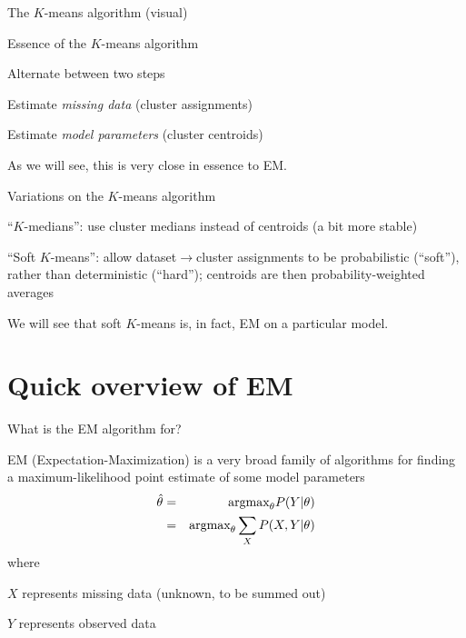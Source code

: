 \documentclass{beamer}
\begin{document}
\begin{frame}{The $K$-means algorithm (visual)}
\end{frame}


\begin{frame}{Essence of the $K$-means algorithm}


Alternate between two steps
 \itemb
 \item Estimate {\em missing data} (cluster assignments)
 \item Estimate {\em model parameters} (cluster centroids)
 \iteme

\vspace{\baselineskip}

As we will see, this is very close in essence to EM.

\end{frame}

\begin{frame}{Variations on the $K$-means algorithm}

\itemb
\item ``$K$-medians'': use cluster medians instead of centroids (a bit more stable)
\item \alert{``Soft $K$-means'':} allow dataset$\to$cluster assignments to be probabilistic (``soft''), rather than deterministic (``hard'');
centroids are then probability-weighted averages
\iteme

We will see that soft $K$-means is, in fact, EM on a particular model.

\end{frame}


\section{Quick overview of EM}

\begin{frame}{What is the EM algorithm for?}

EM (Expectation-Maximization) is a very broad family of algorithms
for finding a \alert{maximum-likelihood point estimate} of some model parameters
\begin{eqnarray*}
\hat{\theta} & = & \mbox{argmax}_{\theta} P(Y|\theta) \\
& = & \mbox{argmax}_{\theta} \sum_X P(X,Y|\theta)
\end{eqnarray*}
where
\itemb
\item $X$ represents \alert{missing data} (unknown, to be summed out)
\item $Y$ represents \alert{observed data}
\iteme

\end{frame}
\end{document}
